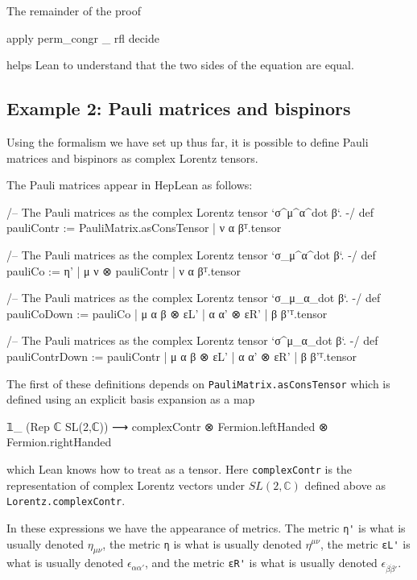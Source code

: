 \documentclass[a4paper, 11pt]{article}
\DeclareRobustCommand{\myinline}{\lstinline}
\begin{document}
The remainder of the proof
\begin{code}
  apply perm_congr _ rfl
  decide
\end{code}
helps Lean to understand that the two sides of the equation are equal.
\subsection{Example 2: Pauli matrices and bispinors} \label{sec:examplePauliBispinor}
Using the formalism we have set up thus far, it is possible to define Pauli matrices and bispinors 
as complex Lorentz tensors.
 
The Pauli matrices appear in HepLean as follows:
\begin{code}
/-- The Pauli matrices as the complex Lorentz tensor `σ^μ^α^{dot β}`. -/
def pauliContr := {PauliMatrix.asConsTensor | ν α β}ᵀ.tensor

/-- The Pauli matrices as the complex Lorentz tensor `σ_μ^α^{dot β}`. -/
def pauliCo := {η' | μ ν ⊗ pauliContr | ν α β}ᵀ.tensor

/-- The Pauli matrices as the complex Lorentz tensor `σ_μ_α_{dot β}`. -/
def pauliCoDown := {pauliCo | μ α β ⊗ εL' | α α' ⊗ εR' | β β'}ᵀ.tensor

/-- The Pauli matrices as the complex Lorentz tensor `σ^μ_α_{dot β}`. -/
def pauliContrDown := {pauliContr | μ α β ⊗ εL' | α α' ⊗ εR' | β β'}ᵀ.tensor
\end{code}
The first of these definitions depends on \myinline|PauliMatrix.asConsTensor| which is defined 
using an explicit basis expansion as a map 
\begin{code}
  𝟙_ (Rep ℂ SL(2,ℂ)) ⟶ complexContr ⊗ Fermion.leftHanded ⊗ Fermion.rightHanded
\end{code}
which Lean 
knows how to treat as a tensor. Here \myinline|complexContr| is the representation of complex Lorentz vectors 
under $SL(2, \mathbb{C})$ defined above as \myinline|Lorentz.complexContr|.

In these expressions we have the appearance of metrics. 
The metric \myinline|η'| is what is usually denoted 
$\eta_{\mu \nu}$, the metric \myinline|η| is what is usually denoted $\eta^{\mu \nu}$, the metric \myinline|εL'| is what is usually denoted 
$\epsilon_{\alpha \alpha'}$, and the metric \myinline|εR'| is what is usually denoted $\epsilon_{\dot \beta \dot \beta'}$.
\end{document}
